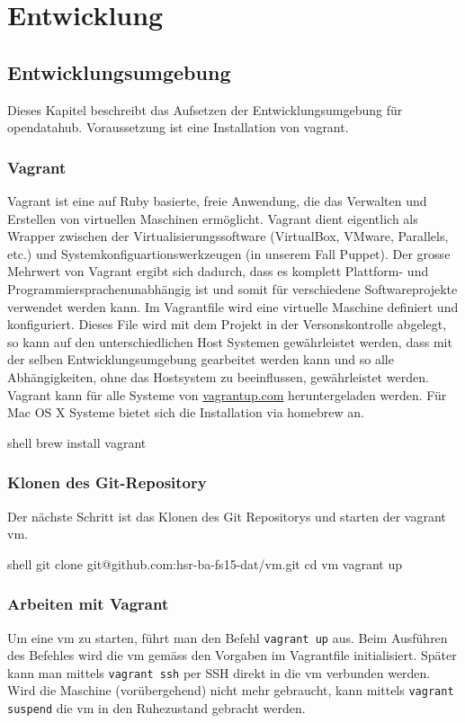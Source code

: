 \chapter{Entwicklung}

\section{Entwicklungsumgebung}
Dieses Kapitel beschreibt das Aufsetzen der Entwicklungsumgebung für opendatahub. Voraussetzung ist eine Installation von vagrant.

\subsection{Vagrant}
Vagrant ist eine auf Ruby basierte, freie Anwendung, die das Verwalten und Erstellen von virtuellen Maschinen ermöglicht. Vagrant dient eigentlich als Wrapper zwischen der Virtualisierungssoftware (VirtualBox, VMware, Parallels, etc.) und Systemkonfiguartionswerkzeugen (in unserem Fall Puppet).
Der grosse Mehrwert von Vagrant ergibt sich dadurch, dass es komplett Plattform- und Programmiersprachenunabhängig ist und somit für verschiedene Softwareprojekte verwendet werden kann. Im Vagrantfile wird eine virtuelle Maschine definiert und konfiguriert. Dieses File wird mit dem Projekt in der Versonskontrolle abgelegt, so kann auf den unterschiedlichen Host Systemen gewährleistet werden, dass mit der selben Entwicklungsumgebung gearbeitet werden kann und so alle Abhängigkeiten, ohne das Hostsystem zu beeinflussen, gewährleistet werden.\\


Vagrant kann für alle Systeme von \url{vagrantup.com} heruntergeladen werden.
Für Mac OS X Systeme bietet sich die Installation via homebrew an.
\begin{src}{shell}
brew install vagrant
\end{src}

\subsection{Klonen des Git-Repository}
Der nächste Schritt ist das Klonen des Git Repositorys und starten der vagrant vm.
\begin{src}{shell}
git clone git@github.com:hsr-ba-fs15-dat/vm.git
cd vm
vagrant up
\end{src}


\subsection{Arbeiten mit Vagrant}
Um eine \gls{vm} zu starten, führt man den Befehl \texttt{vagrant up} aus. Beim Ausführen des Befehles wird die \gls{vm} gemäss den Vorgaben im Vagrantfile initialisiert. Später kann man mittels \texttt{vagrant ssh} per SSH direkt in die \gls{vm} verbunden werden. Wird die Maschine (vorübergehend) nicht mehr gebraucht, kann mittels \texttt{vagrant suspend} die \gls{vm} in den Ruhezustand gebracht werden.


